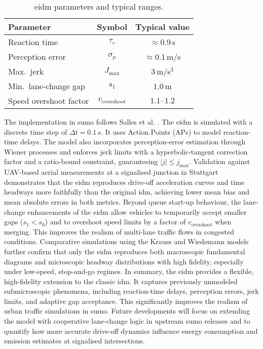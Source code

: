 \begin{table}[ht]
  \centering
  \caption{\ac{eidm} parameters and typical ranges. \cite{Salles2022}}
  \label{tab:eidm_params}
  \begin{tabular}{lcc}
    \toprule
    Parameter            & Symbol             & Typical value  \\
    \midrule
    Reaction time        & $\tau_r$           & $\approx0.9\,$s    \\
    Perception error     & $\sigma_p$         &$\approx0.1\,$m/s  \\
    Max.\ jerk           & $J_\text{max}$     & $3\,$m/s$^3$ \\
    Min.\ lane-change gap & $s_1$             & $1.0\,$m    \\
    Speed overshoot factor & $v_\text{overshoot}$ & $1.1\text{–}1.2$  \\
    \bottomrule
  \end{tabular}
\end{table}

The implementation in \ac{sumo} follows Salles et al. \cite{Salles2022}. The \ac{eidm} is simulated with a discrete time step of $\Delta t = 0.1\,\unit{s}$. It uses Action Points (APs) to model reaction-time delays. The model also incorporates perception-error estimation through Wiener processes and enforces jerk limits with a hyperbolic-tangent correction factor and a ratio-bound constraint, guaranteeing $|j|\le j_{\max}$. Validation against UAV-based aerial measurements at a signalised junction in Stuttgart demonstrates that the \ac{eidm} reproduces drive-off acceleration curves and time headways more faithfully than the original \ac{idm}, achieving lower mean bias and mean absolute errors in both metrics. Beyond queue start-up behaviour, the lane-change enhancements of the \ac{eidm} allow vehicles to temporarily accept smaller gaps ($s_1 < s_0$) and to overshoot speed limits by a factor of $v_\text{overshoot}$ when merging. This improves the realism of multi-lane traffic flows in congested conditions. Comparative simulations using the Krauss and Wiedemann models further confirm that only the \ac{eidm} reproduces both macroscopic fundamental diagrams and microscopic headway distributions with high fidelity, especially under low-speed, stop-and-go regimes. \cite{Schrader2023}
\mynewline
In summary, the \ac{eidm} provides a flexible, high-fidelity extension to the classic \ac{idm}. It captures previously unmodeled submicroscopic phenomena, including reaction-time delays, perception errors, jerk limits, and adaptive gap acceptance. This significantly improves the realism of urban traffic simulations in \ac{sumo}. Future developments will focus on extending the model with cooperative lane-change logic in upstream \ac{sumo} releases and to quantify how more accurate drive-off dynamics influence energy consumption and emission estimates at signalised intersections. \cite{Salles2022}

